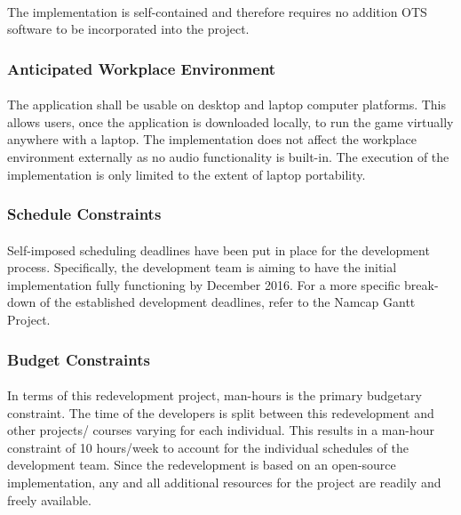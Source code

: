 \documentclass[12pt, titlepage]{article}
\begin{document}
\paragraph{}
The implementation is self-contained and therefore requires no addition OTS software to be incorporated into the project.

\subsubsection{Anticipated Workplace Environment}
\paragraph{}
The application shall be usable on desktop and laptop computer platforms. This allows users, once the application is downloaded locally, to run the game virtually anywhere with a laptop. The implementation does not affect the workplace environment externally as no audio functionality is built-in. The execution of the implementation is only limited to the extent of laptop portability.
 
\subsubsection{Schedule Constraints}
\paragraph{}
Self-imposed scheduling deadlines have been put in place for the development process. Specifically, the development team is aiming to have the initial implementation fully functioning by December 2016. For a more specific break-down of the established development deadlines, refer to the Namcap Gantt Project.

\subsubsection{Budget Constraints}
\paragraph{}
In terms of this redevelopment project, man-hours is the primary budgetary constraint. The time of the developers is split between this redevelopment and other projects/ courses varying for each individual. This results in a man-hour constraint of 10 hours/week to account for the individual schedules of the development team.  Since the redevelopment is based on an open-source implementation, any and all additional resources for the project are readily and freely available.
\end{document}
